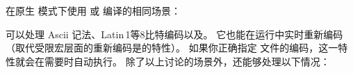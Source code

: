 \begin{itemize}
\begin{ltxexample}
\usepackage[utf8]{inputenc}
\usepackage[bibencoding=latin1]{biblatex}
\end{ltxexample}

在原生 \utf 模式下使用 \XeTeX 或 \LuaTeX 编译的相同场景：

\begin{ltxexample}
\usepackage[bibencoding=latin1]{biblatex}
\end{ltxexample}

\end{itemize}


\biber 可以处理 Ascii 记法、Latin\,1等8比特编码以及\utf。
它也能在运行中实时重新编码 
（取代受限宏层面的重新编码是\biblatex 的特性）。
如果你正确指定  文件的编码，这一特性就会在需要时自动执行。
除了以上讨论的场景外，\biber 还能够处理以下情况：

